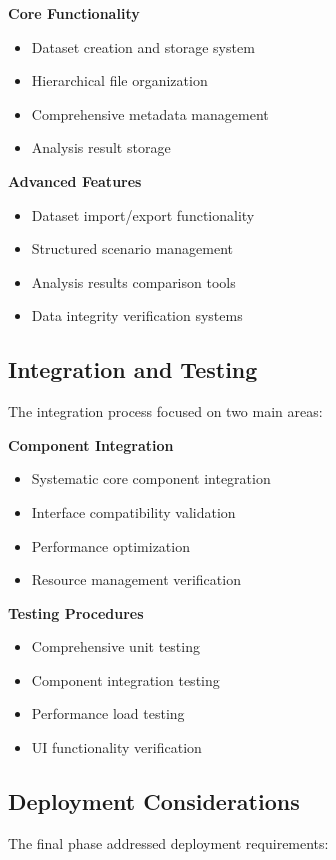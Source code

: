 \textbf{Core Functionality}
\begin{itemize}
    \item Dataset creation and storage system
    \item Hierarchical file organization
    \item Comprehensive metadata management
    \item Analysis result storage
\end{itemize}

\textbf{Advanced Features}
\begin{itemize}
    \item Dataset import/export functionality
    \item Structured scenario management
    \item Analysis results comparison tools
    \item Data integrity verification systems
\end{itemize}

\subsection{Integration and Testing}
The integration process focused on two main areas:

\textbf{Component Integration}
\begin{itemize}
    \item Systematic core component integration
    \item Interface compatibility validation
    \item Performance optimization
    \item Resource management verification
\end{itemize}

\textbf{Testing Procedures}
\begin{itemize}
    \item Comprehensive unit testing
    \item Component integration testing
    \item Performance load testing
    \item UI functionality verification
\end{itemize}

\subsection{Deployment Considerations}
The final phase addressed deployment requirements:

